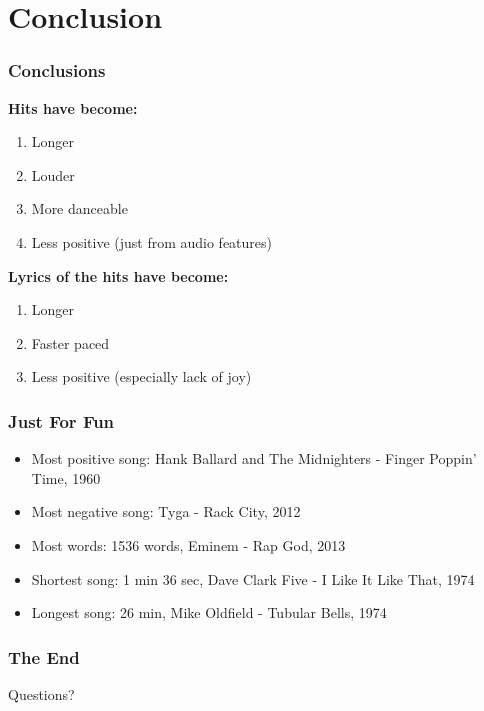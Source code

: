 \documentclass[10pt]{beamer}
\begin{document}
\section{Conclusion}

\begin{frame}
\frametitle{Conclusions}

\textbf{Hits have become:}
\medskip
\begin{enumerate}
    \item Longer
    \item Louder
    \item More danceable
    \item Less positive (just from audio features)
\end{enumerate}
\bigskip

\textbf{Lyrics of the hits have become:}
\medskip
\begin{enumerate}
    \item Longer
    \item Faster paced
    \item Less positive (especially lack of joy)
\end{enumerate}

\end{frame}

\begin{frame}
    \frametitle{Just For Fun}
    \begin{itemize}
        \item Most positive song: Hank Ballard and The Midnighters - Finger Poppin' Time, 1960
        \item Most negative song: Tyga - Rack City, 2012
        \item Most words: 1536 words,  Eminem - Rap God, 2013
        \item Shortest song: 1 min 36 sec, Dave Clark Five - I Like It Like That, 1974
        \item Longest song: 26 min, Mike Oldfield - Tubular Bells, 1974
    \end{itemize}
\end{frame}
\begin{frame}
\frametitle{The End}

\LARGE{\centerline{Questions?}}

\end{frame}

\end{document}

